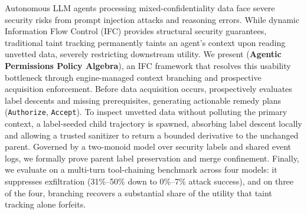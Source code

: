 Autonomous LLM agents processing mixed-confidentiality data face severe security risks from prompt injection attacks and reasoning errors. While dynamic Information Flow Control (IFC) provides structural security guarantees, traditional taint tracking permanently taints an agent's context upon reading unvetted data, severely restricting downstream utility. We present \appa{} (\textbf{Agentic Permissions Policy Algebra}), an IFC framework that resolves this usability bottleneck through engine-managed context branching and prospective acquisition enforcement. Before data acquisition occurs, \appa{} prospectively evaluates label descents and missing prerequisites, generating actionable remedy plans (\texttt{Authorize}, \texttt{Accept}). To inspect unvetted data without polluting the primary context, a label-seeded child trajectory is spawned, absorbing label descent locally and allowing a trusted sanitizer to return a bounded derivative to the unchanged parent. Governed by a two-monoid model over security labels and shared event logs, we formally prove parent label preservation and merge confinement. Finally, we evaluate \appa{} on a multi-turn tool-chaining benchmark across four models: it suppresses exfiltration (31\%--50\% down to 0\%--7\% attack success), and on three of the four, branching recovers a substantial share of the utility that taint tracking alone forfeits.
